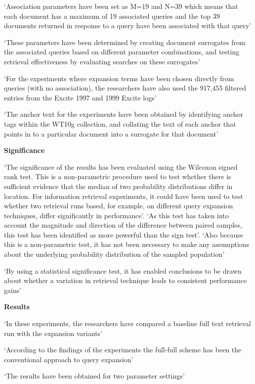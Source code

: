 \documentclass[]{article}
\begin{document}
{{‘Association parameters have been set as M=19 and N=39 which means that each document has a maximum of 19 associated queries and the top 39 documents returned in response to a query have been associated with that query’
	
‘These parameters have been determined by creating document surrogates from the associated queries based on different parameter combinations, and testing retrieval effectiveness by evaluating searches on these surrogates’ 

‘For the experiments where expansion terms have been chosen directly from queries (with no association), the researchers have also used the 917,455 filtered entries from the Excite 1997 and 1999 Excite logs’

‘The anchor text for the experiments have been obtained by identifying anchor tags within the WT10g collection, and collating the text of each anchor that points in to a particular document into a surrogate for that document’

\textbf{Significance}

‘The significance of the results has been evaluated using the Wilcoxon signed rank test. This is a non-parametric procedure used to test whether there is sufficient evidence that the median of two probability distributions differ in location. For information retrieval experiments, it could have been used to test whether two retrieval runs based, for example, on different query expansion techniques, differ significantly in performance’. ‘As this test has taken into account the magnitude and direction of the difference between paired samples, this test has been identified as more powerful than the sign test’. ‘Also because this is a non-parametric test, it has not been necessary to make any assumptions about the underlying probability distribution of the sampled population’

‘By using a statistical significance test, it has enabled conclusions to be drawn about whether a variation in retrieval technique leads to consistent performance gains’

\textbf{Results}

‘In these experiments, the researchers have compared a baseline full text retrieval run with the expansion variants’

‘According to the findings of the experiments the full-full scheme has been the conventional approach to query expansion’

‘The results have been obtained for two parameter settings’

}}
\end{document}
